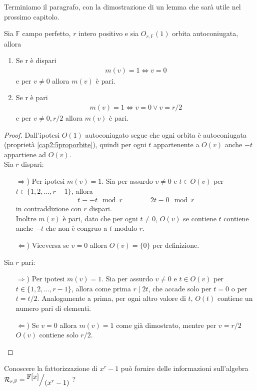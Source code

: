 Terminiamo il paragrafo, con la dimostrazione di un lemma che sarà utile nel prossimo capitolo.
\begin{lemmax} \label{cap2:lemma110}
Sia $\mathbb{F}$ campo perfetto, $r$ intero positivo e sia $O_{r,\mathbb{F}}(1)$ orbita autoconiugata, allora
\begin{enumerate}
   \item Se r è dispari
      \begin{align*}
         m(v) = 1 \iff v = 0
      \end{align*}
      e per $v \neq 0$ allora $m(v)$ è pari.
   \item Se r è pari
      \begin{align*}
         m(v) = 1 \iff v = 0 \lor v = r/2
      \end{align*}
      e per $v \neq 0, r/2$ allora $m(v)$ è pari.
\end{enumerate}
\end{lemmax}

\begin{proof}
Dall'ipotesi $O(1)$ autoconiugato segue che ogni orbita è autoconiugata (proprietà \ref{cap2:5proporbite}), quindi per ogni $t$ appartenente a $O(v)$ anche $-t$ appartiene ad $O(v)$. \\
Sia $r$ dispari:
\begin{itemize}
   \item[$\Rightarrow$)] Per ipotesi $m(v)=1$. Sia per assurdo $v\neq 0$ e $t\in O(v)$ per $t \in \lbrace 1,2,\dots, r-1\rbrace$, allora
   \begin{align*}
     t \equiv -t \mod{r} \qquad \qquad 2t \equiv 0 \mod{r}
   \end{align*}
   in contraddizione con $r$ dispari.\\
   Inoltre $m(v)$ è pari, dato che per ogni $t\neq 0$, $O(v)$ se contiene $t$ contiene anche $-t $ che non è congruo a  $t$ modulo $r$.
   \item[$\Leftarrow$)] Viceversa se $v=0$ allora $O(v) = \lbrace 0 \rbrace$ per definizione.
\end{itemize}
Sia $r$ pari:
\begin{itemize}
   \item[$\Rightarrow$)] Per ipotesi $m(v)=1$. Sia per assurdo $v\neq 0$ e $t\in O(v)$ per $t \in \lbrace 1,2,\dots, r-1\rbrace$, allora come prima $r\mid 2t$, che accade solo per $t=0$ o per $t=t/2$. Analogamente a prima, per ogni altro valore di $t$, $O(t)$ contiene un numero pari di elementi.
   \item[$\Leftarrow$)] Se $v=0$ allora $m(v)=1$ come già dimostrato, mentre per $v=r/2$ $O(v)$ contiene solo $r/2$.
\end{itemize}
\end{proof}
Conoscere la fattorizzazione di $x^r - 1$ può fornire delle informazioni sull'algebra $\mathcal{R}_{r,\mathbb{F}} = \quotient{\mathbb{F} \lbrack x \rbrack  }{(x^{r} - 1)}$ ?

